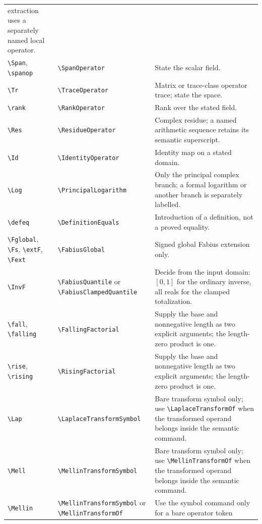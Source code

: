 \documentclass[11pt,oneside]{article}
\theoremstyle{definition}
\theoremstyle{remark}
\DeclareRobustCommand{\commandname}[1]{\texttt{\textbackslash#1}}
\begin{document}
\begin{longtable}{@{}p{}p{}p{}@{}}
extraction uses a separately named local operator.\\
\commandname{Span}, \commandname{spanop} & \commandname{SpanOperator} & State the scalar
field.\\
\commandname{Tr} & \commandname{TraceOperator} & Matrix or trace-class operator trace;
state the space.\\
\commandname{rank} & \commandname{RankOperator} & Rank over the stated field.\\
\commandname{Res} & \commandname{ResidueOperator} & Complex residue; a named arithmetic
sequence retains its semantic superscript.\\
\commandname{Id} & \commandname{IdentityOperator} & Identity map on a stated domain.\\
\commandname{Log} & \commandname{PrincipalLogarithm} & Only the principal complex
branch; a formal logarithm or another branch is separately labelled.\\
\commandname{defeq} & \commandname{DefinitionEquals} & Introduction of a definition,
not a proved equality.\\
\commandname{Fglobal}, \commandname{Fs}, \commandname{extF}, \commandname{Fext} &
\commandname{FabiusGlobal} & Signed global Fabius extension only.\\
\commandname{InvF} & \commandname{FabiusQuantile} or
\commandname{FabiusClampedQuantile} & Decide from the input domain: $[0,1]$ for the
ordinary inverse, all reals for the clamped totalization.\\
\commandname{fall}, \commandname{falling} & \commandname{FallingFactorial} & Supply the base and
nonnegative length as two explicit arguments; the length-zero product is one.\\
\commandname{rise}, \commandname{rising} & \commandname{RisingFactorial} & Supply the base and
nonnegative length as two explicit arguments; the length-zero product is one.\\
\commandname{Lap} & \commandname{LaplaceTransformSymbol} & Bare transform
symbol only; use \commandname{LaplaceTransformOf} when the transformed operand
belongs inside the semantic command.\\
\commandname{Mell} & \commandname{MellinTransformSymbol} & Bare transform
symbol only; use \commandname{MellinTransformOf} when the transformed operand
belongs inside the semantic command.\\
\commandname{Mellin} & \commandname{MellinTransformSymbol} or
\commandname{MellinTransformOf} & Use the symbol command only for a bare operator token

\end{longtable}
\end{document}

